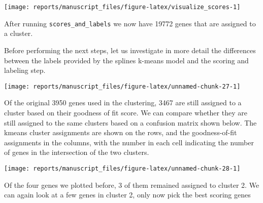 \documentclass[9pt,a4paper,]{extarticle}
\newenvironment{Shaded}{\begin{snugshade}}{\end{snugshade}}
\newcommand{\CommentTok}[1]{\textcolor[rgb]{0.56,0.35,0.01}{\textit{#1}}}
\newcommand{\DataTypeTok}[1]{\textcolor[rgb]{0.13,0.29,0.53}{#1}}
\newcommand{\DecValTok}[1]{\textcolor[rgb]{0.00,0.00,0.81}{#1}}
\newcommand{\FloatTok}[1]{\textcolor[rgb]{0.00,0.00,0.81}{#1}}
\newcommand{\KeywordTok}[1]{\textcolor[rgb]{0.13,0.29,0.53}{\textbf{#1}}}
\newcommand{\NormalTok}[1]{#1}
\newcommand{\OperatorTok}[1]{\textcolor[rgb]{0.81,0.36,0.00}{\textbf{#1}}}
\newcommand{\OtherTok}[1]{\textcolor[rgb]{0.56,0.35,0.01}{#1}}
\newcommand{\StringTok}[1]{\textcolor[rgb]{0.31,0.60,0.02}{#1}}
\begin{document}
\begin{center}\texttt{[image: reports/manuscript\_files/figure-latex/visualize\_scores-1]} \end{center}

After running \texttt{scores\_and\_labels} we now have 19772 genes that
are assigned to a cluster.

Before performing the next steps, let us investigate in more detail the
differences between the labels provided by the splines k-means model and the
scoring and labeling step.

\begin{center}\texttt{[image: reports/manuscript\_files/figure-latex/unnamed-chunk-27-1]} \end{center}

Of the original 3950 genes used in the
clustering, 3467 are still assigned to a cluster based on their goodness of
fit score. We can compare whether they are still assigned to the same clusters
based on a confusion matrix shown below. The kmeans cluster assignments are
shown on the rows, and the goodness-of-fit assignments in the columns, with
the number in each cell indicating the number of genes in the intersection of
the two clusters.

\begin{center}\texttt{[image: reports/manuscript\_files/figure-latex/unnamed-chunk-28-1]} \end{center}

Of the four genes we plotted before, 3 of them remained assigned to cluster 2. We can again look at a
few genes in cluster 2, only now pick the best scoring genes

\begin{Shaded}
\end{Shaded}
\end{document}
